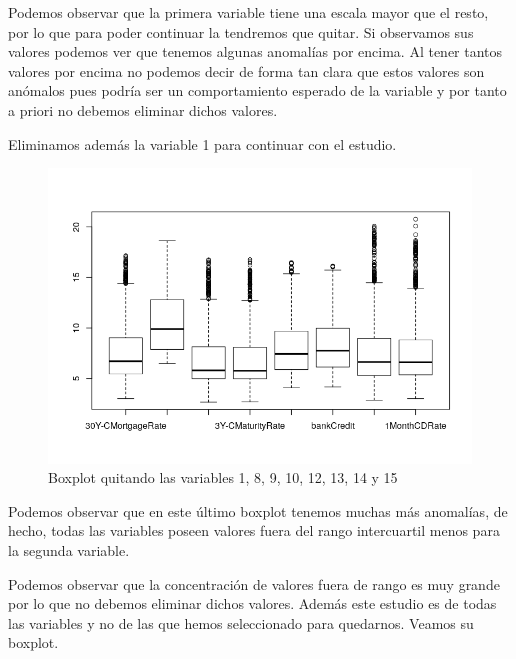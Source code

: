 \documentclass[12pt,a4paper]{article}
\begin{document}
Podemos observar que la primera variable tiene una escala mayor que el resto, por lo que para poder continuar la tendremos que quitar. Si observamos sus valores podemos ver que tenemos algunas anomalías por encima. Al tener tantos valores por encima no podemos decir de forma tan clara que estos valores son anómalos pues podría ser un comportamiento esperado de la variable y por tanto a priori no debemos eliminar dichos valores.

Eliminamos además la variable 1 para continuar con el estudio.

\begin{figure}[H]
	\centering
	\includegraphics[scale=0.8]{./Imagenes/boxplot_filtrado2.png}
	\caption{Boxplot quitando las variables 1, 8, 9, 10, 12, 13, 14 y 15}
\end{figure}

Podemos observar que en este último boxplot tenemos muchas más anomalías, de hecho, todas las variables poseen valores fuera del rango intercuartil menos para la segunda variable.

Podemos observar que la concentración de valores fuera de rango es muy grande por lo que no debemos eliminar dichos valores. Además este estudio es de todas las variables y no de las que hemos seleccionado para quedarnos. Veamos su boxplot.
\end{document}
